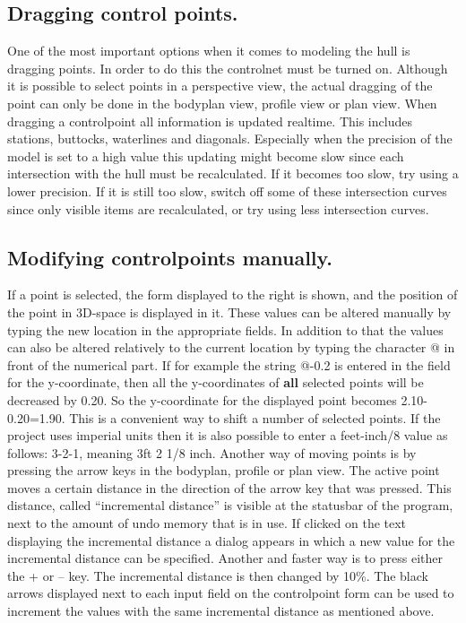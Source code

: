 \documentclass[12pt]{article}
\begin{document}
\subsection{Dragging control points.}
One of the most important options when it comes to modeling the hull
is dragging points. In order to do this the controlnet must be turned
on. Although it is possible to select points in a perspective view,
the actual dragging of the point can only be done in the bodyplan
view, profile view or plan view. When dragging a controlpoint all
information is updated realtime. This includes stations, buttocks,
waterlines and diagonals. Especially when the precision of the model
is set to a high value this updating might become slow since each
intersection with the hull must be recalculated. If it becomes too
slow, try using a lower precision. If it is still too slow, switch off
some of these intersection curves since only visible items are
recalculated, or try using less intersection curves.

\subsection{Modifying controlpoints manually.}
If a point is selected, the form displayed to the right is shown, and
the position of the point in 3D-space is displayed in it. These values
can be altered manually by typing the new location in the appropriate
fields. In addition to that the values can also be altered relatively
to the current location by typing the character @ in front of the
numerical part. If for example the string @-0.2 is entered in the
field for the y-coordinate, then all the y-coordinates of \textbf{all}
selected points will be decreased by 0.20. So the y-coordinate for the
displayed point becomes 2.10-0.20=1.90. This is a convenient way to
shift a number of selected points. If the project uses imperial units
then it is also possible to enter a feet-inch/8 value as follows:
3-2-1, meaning 3ft 2 1/8 inch.  Another way of moving points is by
pressing the arrow keys in the bodyplan, profile or plan view.  The
active point moves a certain distance in the direction of the arrow
key that was pressed. This distance, called “incremental distance” is
visible at the statusbar of the program, next to the amount of undo
memory that is in use. If clicked on the text displaying the
incremental distance a dialog appears in which a new value for the
incremental distance can be specified. Another and faster way is to
press either the + or – key. The incremental distance is then changed
by 10\%.  The black arrows displayed next to each input field on the
controlpoint form can be used to increment the values with the same
incremental distance as mentioned above.
\end{document}
